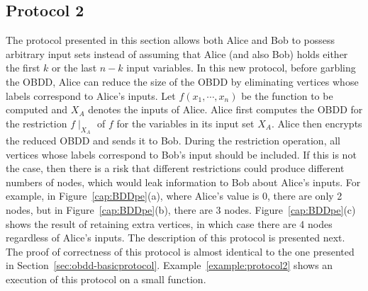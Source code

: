 \subsection{Protocol 2}
\label{subsec:protocol2}

The protocol presented in this section allows both Alice and Bob to
possess arbitrary input sets instead of assuming that Alice (and also
Bob) holds either the first $k$ or the last $n-k$ input variables.  In
this new protocol, before garbling the OBDD, Alice can reduce the size
of the OBDD by eliminating vertices whose labels correspond to Alice's
inputs.  Let $f(x_1,\cdots,x_n)$ be the function to be computed and
$X_A$ denotes the inputs of Alice. Alice first computes the OBDD  for the restriction $f
\mid_{X_A}$ of $f$ for the variables in its input
set $X_A$. Alice then encrypts the reduced OBDD and sends it to
Bob. During the restriction operation, all vertices whose labels
correspond to Bob's input should be included. If this is not the case,
then there is a risk that different restrictions could produce
different numbers of nodes, which would leak information to Bob about
Alice's inputs. For example, in Figure~\ref{cap:BDDpe}(a), where
Alice's value is $0$, there are only 2 nodes, but in
Figure~\ref{cap:BDDpe}(b), there are 3 nodes.
Figure~\ref{cap:BDDpe}(c) shows the result of retaining extra
vertices, in which case there are 4 nodes regardless of Alice's
inputs. The description of this protocol is presented next.
The proof of correctness of this protocol
is almost identical to the one presented in
Section~\ref{sec:obdd-basicprotocol}. Example~\ref{example:protocol2} shows
an execution of this protocol on a small function.

